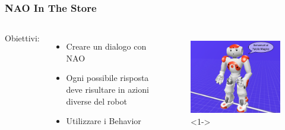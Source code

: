 \documentclass[aspectratio=169]{beamer}
\begin{document}
\begin{frame}
\frametitle{NAO In The Store}
\begin{columns}
		Obiettivi:
		\begin{itemize}
			\item<2-> Creare un dialogo con NAO
			\item<3-> Ogni possibile risposta deve risultare in azioni diverse del robot
			\item<4-> Utilizzare i Behavior
		\end{itemize}
		\begin{figure}[ht]
		\begin{center}
		\includegraphics[width=.9\textwidth]{paiolo}<1->
		\end{center}
		\end{figure}
\end{columns}
\end{frame}
\end{document}
